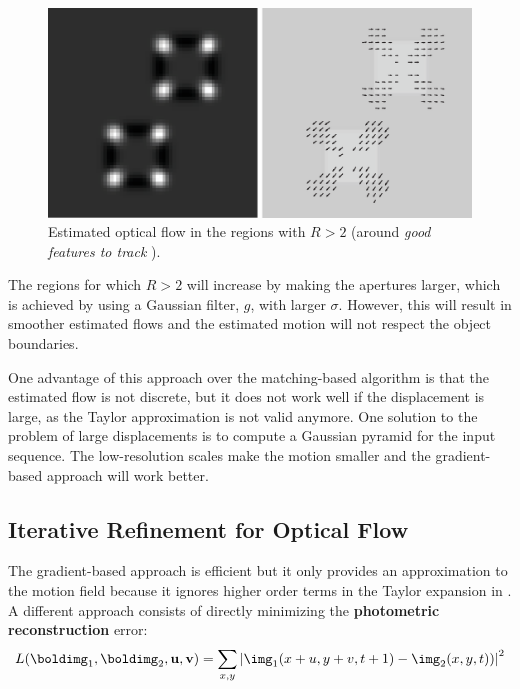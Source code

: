 \begin{figure}[h!]
    \centerline{
        \includegraphics[width=.7\linewidth]{figures/optical_flow/square_grandient_based_4.eps}
    }
    \caption{Estimated optical flow in the regions with $R > 2$ (around {\em good features to track} \cite{shi1994goodfeatures}).}
    \label{fig:square_grandient_based_4}
\end{figure}

The regions for which $R > 2$ will increase by making the apertures larger, which is achieved by using a Gaussian filter, $g$, with larger $\sigma$. However, this will result in smoother estimated flows and the estimated motion will not respect the object boundaries.

One advantage of this approach over the matching-based algorithm is that the estimated flow is not discrete, but it does not work well if the displacement is large, as the Taylor approximation is not valid anymore. One solution to the problem of large displacements is to compute a Gaussian pyramid for the input sequence. The low-resolution scales make the motion smaller and the gradient-based approach will work better.

\subsection{Iterative Refinement for Optical Flow}

The gradient-based approach is efficient but it only provides an approximation to the motion field because it ignores higher order terms in the Taylor expansion in \eqn{\ref{eq:motion_taylor}}. A different approach consists of directly minimizing the {\bf photometric reconstruction} error: 
\begin{equation}
    L(\boldimg_1,\boldimg_2,\mathbf{u}, \mathbf{v})=
    \sum_{x,y} \left| \img_1 (x+u,y+v,t+1) - \img_2 (x,y,t)) \right| ^2
\end{equation}

